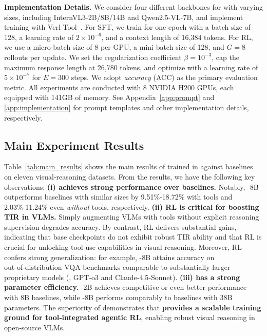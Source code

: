 \noindent \textbf{Implementation Details.}
We consider four different backbones for \ours{} with varying sizes, including InternVL3-2B/8B/14B and Qwen2.5-VL-7B, and implement training with Verl-Tool~\cite{jiang2025verltool}. 
For SFT, we train for one epoch with a batch size of 128, a learning rate of $2\times10^{-6}$, and a context length of 16,384 tokens.
For RL, we use a micro-batch size of 8 per GPU, a mini-batch size of 128, and $G=8$ rollouts per update. We set the regularization coefficient $\beta=10^{-3}$, cap the maximum response length at 26,780 tokens, and optimize with a learning rate of $5\times10^{-7}$ for $E=300$ steps.
We adopt \emph{accuracy} (ACC) as the primary evaluation metric. All experiments are conducted with 8 NVIDIA H200 GPUs, each equipped with 141GB of memory.
See Appendix~\ref{app:prompt} and \ref{app:implementation} for prompt templates and other implementation details, respectively.



\subsection{Main Experiment Results}
Table~\ref{tab:main_results} shows the main results of \ours{} trained in \env{} against baselines on eleven visual‑reasoning datasets. From the results, we have the following key observations:
\textbf{(i) \ours{} achieves strong performance over baselines.} Notably, \ours{}-8B outperforms baselines with similar sizes by 9.51\%-18.72\% with tools and 2.03\%-11.24\% even \emph{without} tools, respectively.
\textbf{(ii) RL is critical for boosting TIR in VLMs.} Simply augmenting VLMs with tools without explicit reasoning supervision degrades accuracy. By contrast, RL delivers substantial gains, indicating that base checkpoints do not exhibit robust TIR ability and that RL is crucial for unlocking tool‑use capabilities in visual reasoning. Moreover, RL confers strong generalization: 
for example, \ours{}-8B attains accuracy on out‑of‑distribution VQA benchmarks comparable to substantially larger proprietary models (\eg, GPT‑o3 and Claude‑4.5‑Sonnet).
\textbf{(iii) \ours{} has a strong parameter efficiency.}
\ours{}-2B achieves competitive or even better performance with 8B baselines, while \ours{}-8B performs comparably to baselines with 38B parameters. 
The superiority of \ours{} demonstrates that \textbf{\env{} provides a scalable training ground for tool‑integrated agentic RL}, enabling robust visual reasoning in open‑source VLMs.

